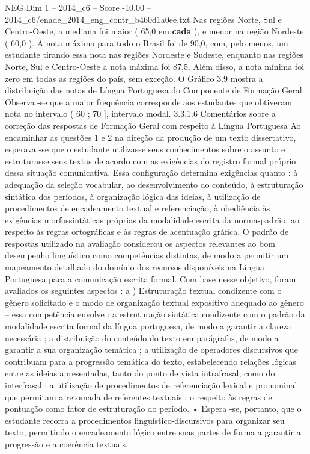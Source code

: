 \begin{textsample}{NEG Dim 1 – 2014\_c6 – Score -10.00 – 2014\_c6/enade\_2014\_eng\_contr\_b460d1a0ee.txt}
Nas regiões Norte, Sul e Centro-Oeste, a mediana foi maior ( 65,0 em \textbf{cada} ), e menor na região Nordeste ( 60,0 ).
A nota máxima para todo o Brasil foi de 90,0, com, pelo menos, um estudante tirando essa nota nas regiões Nordeste e Sudeste, enquanto nas regiões Norte, Sul e Centro-Oeste a nota máxima foi 87,5.
Além disso, a nota mínima foi zero em todas as regiões do país, sem exceção.
O Gráfico 3.9 mostra a distribuição das notas de Língua Portuguesa do Componente de Formação Geral.
Observa -se que a maior frequência corresponde aos estudantes que obtiveram nota no intervalo ( 60 ; 70 ], intervalo modal. 3.3.1.6 Comentários sobre a correção das respostas de Formação Geral com respeito à Língua Portuguesa Ao encaminhar as questões 1 e 2 na direção da produção de um texto dissertativo, esperava -se que o estudante utilizasse seus conhecimentos sobre o assunto e estruturasse seus textos de acordo com as exigências do registro formal próprio dessa situação comunicativa.
Essa configuração determina exigências quanto : à adequação da seleção vocabular, ao desenvolvimento do conteúdo, à estruturação sintática dos períodos, à organização lógica das ideias, à utilização de procedimentos de encadeamento textual e referenciação, à obediência às exigências morfossintáticas próprias da modalidade escrita da norma-padrão, ao respeito às regras ortográficas e às regras de acentuação gráfica.
O padrão de respostas utilizado na avaliação considerou os aspectos relevantes ao bom desempenho linguístico como competências distintas, de modo a permitir um mapeamento detalhado do domínio dos recursos disponíveis na Língua Portuguesa para a comunicação escrita formal.
Com base nesse objetivo, foram avaliados os seguintes aspectos : a ) Estruturação textual condizente com o gênero solicitado e o modo de organização textual expositivo adequado ao gênero – essa competência envolve : a estruturação sintática condizente com o padrão da modalidade escrita formal da língua portuguesa, de modo a garantir a clareza necessária ; a distribuição do conteúdo do texto em parágrafos, de modo a garantir a sua organização temática ; a utilização de operadores discursivos que contribuam para a progressão temática do texto, estabelecendo relações lógicas entre as ideias apresentadas, tanto do ponto de vista intrafrasal, como do interfrasal ; a utilização de procedimentos de referenciação lexical e pronominal que permitam a retomada de referentes textuais ; o respeito às regras de pontuação como fator de estruturação do período. • Espera -se, portanto, que o estudante recorra a procedimentos linguístico-discursivos para organizar seu texto, permitindo o encadeamento lógico entre suas partes de forma a garantir a progressão e a coerência textuais.

\end{textsample}
